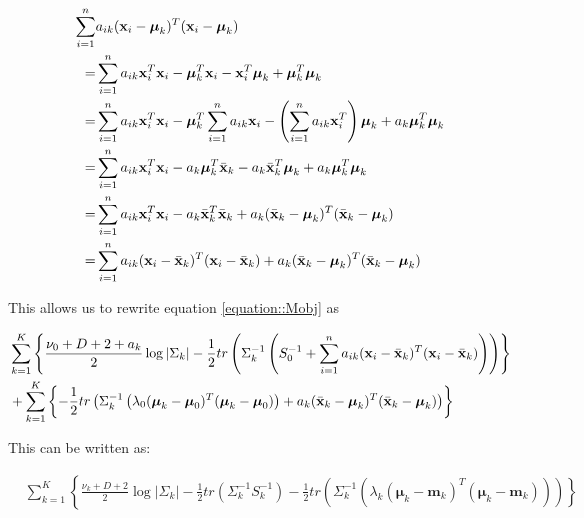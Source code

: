 \documentclass[12pt,english]{article}\usepackage[]{graphicx}\usepackage[]{color}
\begin{document}
\begin{equation}
\begin{split}
\sum_{i=1}^{n} &a_{ik}({\bf x}_i - \boldsymbol{\mu}_k)^{T}({\bf x}_i - \boldsymbol{\mu}_k)\\
 = & \sum_{i=1}^{n} a_{ik}{\bf x}_i^{T}{\bf x}_i - \boldsymbol{\mu}_k^{T}{\bf x}_i -  {\bf x}_i^{T}\boldsymbol{\mu}_k + \boldsymbol{\mu}_k^{T}\boldsymbol{\mu}_k\\
 = & \sum_{i=1}^{n} a_{ik}{\bf x}_i^{T}{\bf x}_i - \boldsymbol{\mu}_k^{T} \sum_{i=1}^{n} a_{ik}{\bf x}_i -  \left(\sum_{i=1}^{n} a_{ik}{\bf x}_i^{T}\right)\boldsymbol{\mu}_k + a_k\boldsymbol{\mu}_k^{T}\boldsymbol{\mu}_k\\
  = & \sum_{i=1}^{n} a_{ik}{\bf x}_i^{T}{\bf x}_i - a_k\boldsymbol{\mu}_k^{T}\bar{{\bf x}}_k -  a_k \bar{{\bf x}}_k^{T}\boldsymbol{\mu}_k + a_k\boldsymbol{\mu}_k^{T}\boldsymbol{\mu}_k\\
  = & \sum_{i=1}^{n} a_{ik}{\bf x}_i^{T}{\bf x}_i - a_k\bar{{\bf x}}_k^{T}\bar{{\bf x}}_k + a_k(\bar{{\bf x}}_k - \boldsymbol{\mu}_k)^{T} (\bar{{\bf x}}_k - \boldsymbol{\mu}_k)\\
  = & \sum_{i=1}^{n} a_{ik}({\bf x}_i -\bar{{\bf x}}_k)^{T}({\bf x}_i -\bar{{\bf x}}_k) + a_k(\bar{{\bf x}}_k - \boldsymbol{\mu}_k)^{T} (\bar{{\bf x}}_k - \boldsymbol{\mu}_k)\\
\end{split}
\end{equation}

This allows us to rewrite equation \ref{equation::Mobj} as

\begin{equation}\label{equation::Mobj2}
\begin{split}
&\sum_{k=1}^{K} \left\{\frac{\nu_0 + D + 2 + a_k }{2} \log|\Sigma_k|  - \frac{1}{2} tr \left(\Sigma_{k}^{-1} \left(S_0^{-1}+ \sum_{i=1}^{n} a_{ik}({\bf x}_i -\bar{{\bf x}}_k)^{T}({\bf x}_i -\bar{{\bf x}}_k) \right)\right)\right\}\\
& +  \sum_{k=1}^{K}\left\{-\frac{1}{2} tr \left( \Sigma_{k}^{-1}\left(\lambda_0(\boldsymbol{\mu}_k - \boldsymbol{\mu}_0)^T(\boldsymbol{\mu}_k - \boldsymbol{\mu}_0)\right) + a_k(\bar{{\bf x}}_k - \boldsymbol{\mu}_k)^{T} (\bar{{\bf x}}_k - \boldsymbol{\mu}_k)\right)\right\} \\
\end{split}
\end{equation}

This can be written as:

\begin{equation}\label{equation::MobjFinal}
\begin{split}
&\sum_{k=1}^{K} \left\{\frac{\nu_k + D + 2}{2} \log|\Sigma_k|  - \frac{1}{2} tr \left(\Sigma_{k}^{-1} S_k^{-1}\right)-\frac{1}{2} tr \left( \Sigma_{k}^{-1}\left(\lambda_k(\boldsymbol{\mu}_k - \boldsymbol{m}_k)^T(\boldsymbol{\mu}_k - \boldsymbol{m}_k)\right)\right)\right\} \\
\end{split}
\end{equation}
\end{document}
